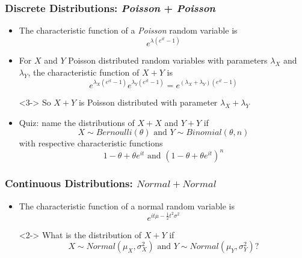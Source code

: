 \documentclass[xcolor={dvipsnames}]{beamer}
\begin{document}
\frame
{
 \frametitle{Discrete Distributions: \emph{Poisson} + \emph{Poisson}} %

\begin{itemize}
\item The characteristic function of a \emph{Poisson} random variable is 
$$e^{\lambda\left(e^{it}-1\right)}$$
\item<2-> For $X$ and $Y$ Poisson distributed random variables with parameters $\lambda_X$
and $\lambda_Y$, the characteristic function of $X + Y$ is
$$e^{\lambda_X\left(e^{it}-1\right)}e^{\lambda_Y\left(e^{it}-1\right)} = e^{(\lambda_X+\lambda_Y)\left(e^{it}-1\right)}$$
\item[]<3-> So $X + Y$ is Poisson distributed with parameter $\lambda_X+\lambda_Y$
\item[]
\item<4-> Quiz: name the distributions of $X+X$ and $Y+Y$ if 
$$X \sim Bernoulli(\theta) \text{ and } Y \sim Binomial(\theta,n )$$
with respective characteristic functions 
$$1 - \theta + \theta e^{it} \text{ and } \left(1 - \theta + \theta e^{it}\right)^n$$
\end{itemize}

}
 
 
\frame
{
 \frametitle{Continuous Distributions: $Normal + Normal$}
 
\begin{itemize}
\item The characteristic function of a normal random variable is
$$ e^{it\mu -\frac{1}{2}t^2\sigma^2}$$
\item[]<2-> What is the distribution of $X + Y$ if
$$ X \sim Normal\left(\mu_X,\sigma^2_X\right) \text{ and }  Y \sim Normal\left(\mu_Y,\sigma^2_Y\right)?$$
\end{itemize} 
}
\end{document}
